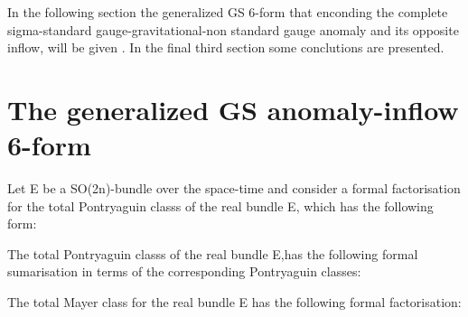 \documentclass[a4paper,a4paper]{article}
\begin{document}
In the following section the generalized GS 6-form that enconding the complete sigma-standard gauge-gravitational-non standard gauge anomaly and its opposite inflow, will be given . In the final third section some conclutions are presented.

\section{The generalized GS anomaly-inflow 6-form}

Let E be a SO(2n)-bundle over the space-time and consider a formal factorisation for the total Pontryaguin classs of the real bundle E, which has the following form:

\begin{center}
{  \coordHE{} }
\end{center}
The total Pontryaguin classs of the real bundle E,has the following formal sumarisation in terms of the corresponding Pontryaguin classes: 
\begin{center}
{  \coordHE{} }
\end{center}
The total Mayer class for the real bundle E has the following formal factorisation:
\begin{center}
{  \coordHE{} }
\end{center}
\end{document}
